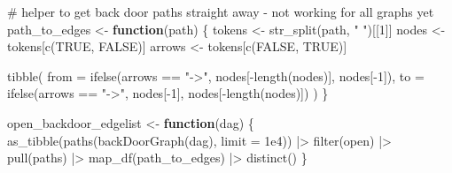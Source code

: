 \documentclass[
  letterpaper,
  DIV=11,
  numbers=noendperiod]{scrartcl}
\newenvironment{Shaded}{\begin{snugshade}}{\end{snugshade}}
\newcommand{\AttributeTok}[1]{\textcolor[rgb]{0.40,0.45,0.13}{#1}}
\newcommand{\CommentTok}[1]{\textcolor[rgb]{0.37,0.37,0.37}{#1}}
\newcommand{\ConstantTok}[1]{\textcolor[rgb]{0.56,0.35,0.01}{#1}}
\newcommand{\ControlFlowTok}[1]{\textcolor[rgb]{0.00,0.23,0.31}{\textbf{#1}}}
\newcommand{\DecValTok}[1]{\textcolor[rgb]{0.68,0.00,0.00}{#1}}
\newcommand{\FloatTok}[1]{\textcolor[rgb]{0.68,0.00,0.00}{#1}}
\newcommand{\FunctionTok}[1]{\textcolor[rgb]{0.28,0.35,0.67}{#1}}
\newcommand{\NormalTok}[1]{\textcolor[rgb]{0.00,0.23,0.31}{#1}}
\newcommand{\OtherTok}[1]{\textcolor[rgb]{0.00,0.23,0.31}{#1}}
\newcommand{\SpecialCharTok}[1]{\textcolor[rgb]{0.37,0.37,0.37}{#1}}
\newcommand{\StringTok}[1]{\textcolor[rgb]{0.13,0.47,0.30}{#1}}
\begin{document}
\begin{Shaded}
\begin{Highlighting}[]
\CommentTok{\# helper to get back door paths straight away {-} not working for all graphs yet}
\NormalTok{path\_to\_edges }\OtherTok{\textless{}{-}} \ControlFlowTok{function}\NormalTok{(path) \{}
\NormalTok{  tokens }\OtherTok{\textless{}{-}} \FunctionTok{str\_split}\NormalTok{(path, }\StringTok{" "}\NormalTok{)[[}\DecValTok{1}\NormalTok{]]}
\NormalTok{  nodes  }\OtherTok{\textless{}{-}}\NormalTok{ tokens[}\FunctionTok{c}\NormalTok{(}\ConstantTok{TRUE}\NormalTok{, }\ConstantTok{FALSE}\NormalTok{)]}
\NormalTok{  arrows }\OtherTok{\textless{}{-}}\NormalTok{ tokens[}\FunctionTok{c}\NormalTok{(}\ConstantTok{FALSE}\NormalTok{, }\ConstantTok{TRUE}\NormalTok{)]}
  
  \FunctionTok{tibble}\NormalTok{(}
    \AttributeTok{from =} \FunctionTok{ifelse}\NormalTok{(arrows }\SpecialCharTok{==} \StringTok{"{-}\textgreater{}"}\NormalTok{, nodes[}\SpecialCharTok{{-}}\FunctionTok{length}\NormalTok{(nodes)], nodes[}\SpecialCharTok{{-}}\DecValTok{1}\NormalTok{]),}
    \AttributeTok{to   =} \FunctionTok{ifelse}\NormalTok{(arrows }\SpecialCharTok{==} \StringTok{"{-}\textgreater{}"}\NormalTok{, nodes[}\SpecialCharTok{{-}}\DecValTok{1}\NormalTok{], nodes[}\SpecialCharTok{{-}}\FunctionTok{length}\NormalTok{(nodes)])}
\NormalTok{  )}
\NormalTok{\}}

\NormalTok{open\_backdoor\_edgelist }\OtherTok{\textless{}{-}} \ControlFlowTok{function}\NormalTok{(dag) \{}
  \FunctionTok{as\_tibble}\NormalTok{(}\FunctionTok{paths}\NormalTok{(}\FunctionTok{backDoorGraph}\NormalTok{(dag), }\AttributeTok{limit =} \FloatTok{1e4}\NormalTok{)) }\SpecialCharTok{|\textgreater{}}
        \FunctionTok{filter}\NormalTok{(open) }\SpecialCharTok{|\textgreater{}} 
      \FunctionTok{pull}\NormalTok{(paths) }\SpecialCharTok{|\textgreater{}} 
      \FunctionTok{map\_df}\NormalTok{(path\_to\_edges) }\SpecialCharTok{|\textgreater{}} 
      \FunctionTok{distinct}\NormalTok{()}
\NormalTok{\}}
\end{Highlighting}
\end{Shaded}
\end{document}
